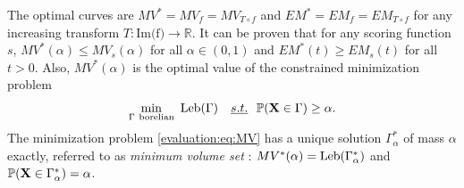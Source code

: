 The optimal curves are $MV^* = MV_f = MV_{T \circ f}$ and $EM^* = EM_f = EM_{T \circ f}$ for any increasing transform $T: \text{Im(f)} \to \mathbb{R}$. %
It can be proven \citep{CLEM13, AISTAT15} that for any scoring function $s$, $MV^*(\alpha)\leq MV_s(\alpha)$ for all $\alpha\in (0,1)$ and $EM^*(t) \ge EM_s(t)$ for all $t > 0$.
%
Also, $MV^*(\alpha)$ is the optimal value of the constrained minimization problem
\begin{equation}\label{evaluation:eq:MV}\min_{\Gamma~ \text{borelian}} ~\text{Leb}(\Gamma) ~~~\emph{s.t.}{}~~ \mathbb{P}(\mathbf X \in \Gamma) \ge \alpha.
\end{equation}
The minimization problem \eqref{evaluation:eq:MV} has a unique solution $\Gamma_\alpha^*$ of mass $\alpha$ exactly, referred to as \textit{minimum volume set} \citep{Polonik97}: $MV^*(\alpha)=\text{Leb}(\Gamma^*_\alpha)$ and $\mathbb{P}(\mathbf X \in \Gamma_\alpha^*)=\alpha$. 

